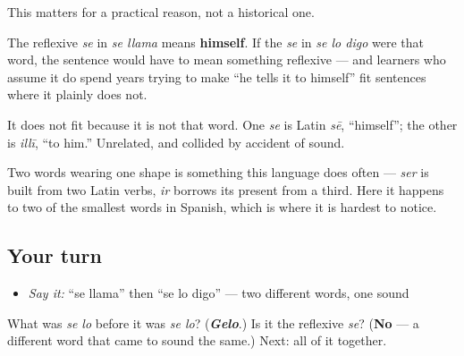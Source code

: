 \begin{culture}
This matters for a practical reason, not a historical one.

The reflexive \emph{se} in \emph{se llama} means \textbf{himself}. If the \emph{se} in \emph{se lo digo} were that word, the sentence would have to mean something reflexive — and learners who assume it do spend years trying to make \textquotedblleft{}he tells it to himself\textquotedblright{} fit sentences where it plainly does not.

It does not fit because it is not that word. One \emph{se} is Latin \emph{sē}, \textquotedblleft{}himself\textquotedblright{}; the other is \emph{illī}, \textquotedblleft{}to him.\textquotedblright{} Unrelated, and collided by accident of sound.

Two words wearing one shape is something this language does often — \emph{ser} is built from two Latin verbs, \emph{ir} borrows its present from a third. Here it happens to two of the smallest words in Spanish, which is where it is hardest to notice.
\end{culture}

\subsection*{Your turn}
\begin{itemize}
\raggedright
  \item \emph{Say it:} \textquotedblleft{}se llama\textquotedblright{} then \textquotedblleft{}se lo digo\textquotedblright{} — two different words, one sound
\end{itemize}

\begin{tcolorbox}[breakable,colback=teal!4,colframe=teal!35!black,title={Before you move on}]
What was \emph{se lo} before it was \emph{se lo}? (\emph{\textbf{Gelo}}.) Is it the reflexive \emph{se}? (\textbf{No} — a different word that came to sound the same.) Next: all of it together.
\end{tcolorbox}
